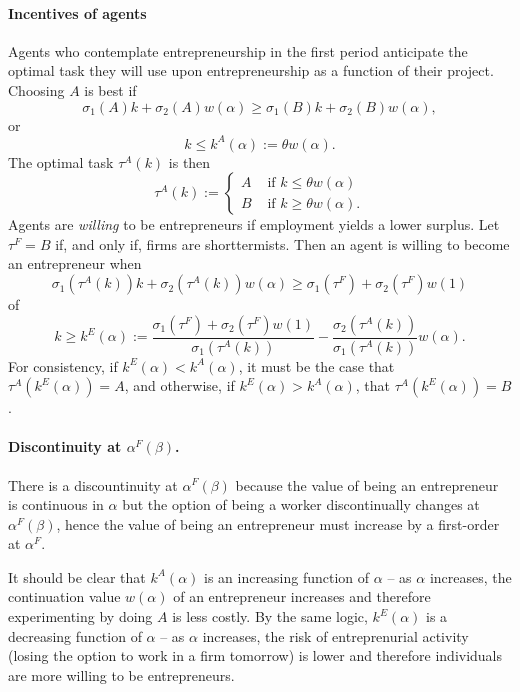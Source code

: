 \documentclass[12pt]{article}
\begin{document}
\paragraph{Incentives of agents}
Agents who contemplate entrepreneurship in the first period anticipate the optimal task they will use upon entrepreneurship as a function of their project. Choosing $A$ is best if 
%
\[
    \sigma_1(A)k+\sigma_2(A)w(\alpha)\geq \sigma_1(B)k+\sigma_2(B)w(\alpha),
\]
%
or
\begin{equation}\label{IC-agent}
    k\leq k^A(\alpha):=\theta   w(\alpha).
\end{equation}
%
The optimal task $\tau^A(k)$ is then
%
\[
\tau^A(k):=\begin{cases}
    A & \text{ if } k\leq \theta  w(\alpha)\\ 
    B & \text{ if } k\geq \theta  w(\alpha).
\end{cases}
\]
%
Agents are \emph{willing} to be entrepreneurs if employment yields a lower surplus. Let $\tau^F=B$ if, and only if, firms are shorttermists. Then an agent is willing to become an entrepreneur when 
%
\[
    \sigma_1(\tau^A(k))k+\sigma_2(\tau^A(k))w(\alpha)\geq \sigma_1(\tau^F)+\sigma_2(\tau^F) w(1)
\]
%
of 
%
\begin{equation}\label{kE}
k\geq k^E(\alpha):=\frac{\sigma_1(\tau^F)+\sigma_2(\tau^F)w(1)}{\sigma_1(\tau^A(k))}-\frac{\sigma_2(\tau^A(k))}{\sigma_1(\tau^A(k))}w(\alpha).
\end{equation}
%
For consistency, if $k^E(\alpha)<k^A(\alpha)$, it must be the case that $\tau^A(k^E(\alpha))=A$, and otherwise, if $k^E(\alpha)>k^A(\alpha)$, that $\tau^A(k^E(\alpha))=B$.

\paragraph{Discontinuity at $\alpha^F(\beta)$.} There is a discountinuity at $\alpha^F(\beta)$ because the value of being an entrepreneur is continuous in $\alpha$ but the option of being a worker discontinually changes at $\alpha^F(\beta)$, hence the value of being an entrepreneur must increase by a first-order at $\alpha^F$. 

It should be clear that $k^A(\alpha)$ is an increasing function of $\alpha$ -- as $\alpha$ increases, the continuation value $w(\alpha)$ of an entrepreneur increases and therefore experimenting by doing $A$ is less costly. By the same logic, $k^E(\alpha)$ is a decreasing function of $\alpha$ -- as $\alpha$ increases, the risk of entreprenurial activity (losing the option to work in a firm tomorrow) is lower and therefore individuals are more willing to be entrepreneurs.
\end{document}
